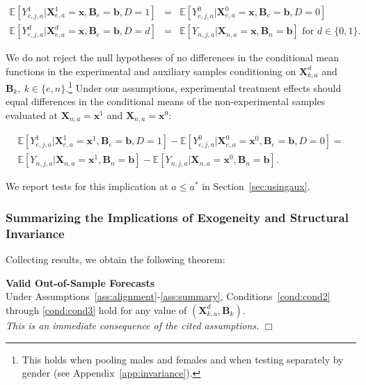 \begin{eqnarray}
\mathbb{E} \left[ Y_{e,j,a}^1 | \bm{X}_{e,a}^1 = \bm{x}, \bm{B}_{e} = \bm{b}, D = 1   \right] &=&  \mathbb{E} \left[ Y_{e,j,a}^0 | \bm{X}_{e,a}^0 = \bm{x}, \bm{B}_{e} = \bm{b}, D = 0   \right] \\
\mathbb{E} \left[ Y_{e,j,a}^d | \bm{X}_{e,a}^d = \bm{x}, \bm{B}_{e} = \bm{b}, D = d   \right] &=&  \mathbb{E} \left[ Y_{n,j,a} | \bm{X}_{n,a} = \bm{x}, \bm{B}_{n} = \bm{b} \right] \text{ for }  d \in \{0,1\}.
\end{eqnarray}

We do not reject the null hypotheses of no differences in the conditional mean functions in the experimental and auxiliary samples conditioning on $\bm{X}_{k,a}^d$ and $\bm{B}_k, \: k \in \{e,n\}$.\footnote{This holds when pooling males and females and when testing separately by gender (see  Appendix~\ref{app:invariance}).} Under our assumptions, experimental treatment effects should equal differences in the conditional means of the non-experimental samples evaluated at $\bm{X}_{n,a} = \bm{x}^1$ and  $\bm{X}_{n,a} = \bm{x}^0$:

\begin{eqnarray}
\mathbb{E} \left[ Y_{e,j,a}^1 |  \bm{X}_{e,a}^1 = \bm{x}^1, \bm{B}_e = \bm{b}, D = 1 \right] - \mathbb{E} \left[ Y_{e,j,a}^0 |  \bm{X}_{e,a}^0 = \bm{x}^0, \bm{B}_e = \bm{b}, D = 0 \right] = \nonumber \\
\mathbb{E} \left[ Y_{n,j,a} | \bm{X}_{n,a} = \bm{x}^1, \bm{B}_n = \bm{b} \right] - \mathbb{E} \left[ Y_{n,j,a} | \bm{X}_{n,a} = \bm{x}^0, \bm{B}_n = \bm{b} \right].
\end{eqnarray} 

We report tests for this implication at $a \leq a^*$ in Section~\ref{sec:usingaux}.

\subsubsection{Summarizing the Implications of Exogeneity and Structural Invariance}

Collecting results, we obtain the following theorem:

\onehalfspacing
\setcounter{theorem}{0}
\begin{theorem}\label{theorem:main} \textbf{Valid Out-of-Sample Forecasts} \\
Under Assumptions~\ref{ass:alignment}-\ref{ass:summary}, Conditions~\ref{cond:cond2} through \ref{cond:cond3} hold for any value of $\left( \bm{X}^d_{k,a}, \bm{B}_k \right)$. \\
\emph{This is an immediate consequence of the cited assumptions.} $\Box$
\end{theorem}
\doublespacing


